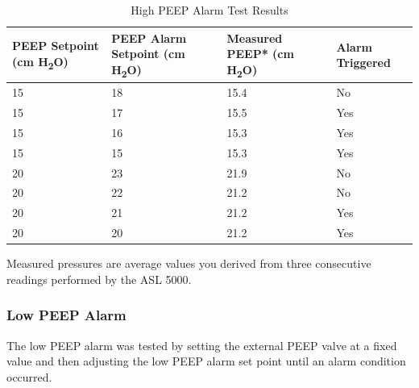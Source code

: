 \documentclass[]{article}
\begin{document}
\begin{center}
	\begin{table}[h]
		\caption{High PEEP Alarm Test Results}
		\label{tab:high_peep_test}
		\begin{tabular}{ |p{3.7cm}|p{3.3cm}|p{4cm}| p{2.9cm}|}
			
			\hline
			\textbf{PEEP Setpoint (cm H\textsubscript{2}O)} & \textbf{PEEP Alarm Setpoint (cm H\textsubscript{2}O)} & \textbf{Measured PEEP* (cm H\textsubscript{2}O)} & \textbf{Alarm Triggered}  \\ \hline
			15 & 18 & 15.4 & No\\ \hline
			15 & 17 & 15.5& Yes\\ \hline
			15 & 16 & 15.3 & Yes\\ \hline
			15 & 15 & 15.3 & Yes\\ \hline
			20 & 23 & 21.9 & No\\ \hline
			20 & 22 & 21.2 & No\\ \hline
			20 & 21 & 21.2 & Yes\\ \hline
			20 & 20 & 21.2 & Yes\\ \hline
		\end{tabular}

		\noindent *Measured pressures are average values you derived from three consecutive readings performed by the ASL 5000.
	\end{table}	
\end{center}

\subsubsection{Low PEEP Alarm}

The low PEEP alarm was tested by setting the external PEEP valve at a fixed value and then adjusting the low PEEP alarm set point until an alarm condition occurred.
\end{document}
